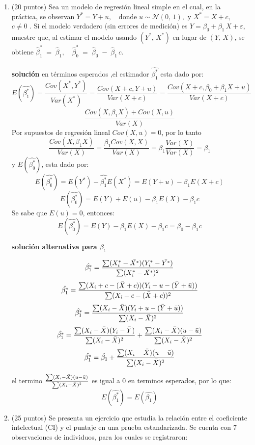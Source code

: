 \documentclass[10pt,a4paper]{article}
\begin{document}
\begin{enumerate}
\begin{enumerate}
\end{enumerate}

\item (20 puntos) Sea un modelo de regresión lineal simple en el cual, en la práctica, se observan $
Y^* = Y + u, \quad \text{donde } u \sim \mathcal{N}(0,\,1),
$ y $
X^* = X + c$, \quad {} $c \neq 0$ . Si el modelo verdadero (sin errores de medición) es $
Y = \beta_0 + \beta_1 \, X + \varepsilon$, muestre que, al estimar el modelo usando \((Y^*,\,X^*)\) en lugar de \((Y,\,X)\), se obtiene $\hat{\beta}_1^* \;=\; \hat{\beta}_1,
\quad
\hat{\beta}_0^* \;=\; \hat{\beta}_0 \;-\;\hat{\beta}_1 \, c.
$
\\
\\
\textbf{solución}
en términos esperados ,el estimador $\hat{\beta^*_1}$ esta dado por:
$$E(\hat{\beta^*_1})  =  \frac{Cov(X^*,Y^*)}{Var(X^*)} = \frac{Cov(X+c,Y+u)}{Var(X+c)}=\frac{Cov(X+c,\beta_0 + \beta_1X+u)}{Var(X+c)}$$
$$\frac{Cov(X,\beta_1X)+Cov(X,u)}{Var(X)}$$
Por supuestos de regresión lineal $Cov(X,u)=0$, por lo tanto
$$\frac{Cov(X,\beta_1X)}{Var(X)}=\frac{\beta_1Cov(X,X)}{Var(X)}=\beta_1\frac{Var(X)}{Var(X)}=\beta_1$$
y $E(\hat{\beta^*_0})$, esta dado por:
$$E(\hat{\beta^*_0})=E(Y^*)-\hat{\beta^*_1}E(X^*)=E(Y+u)-\beta_1E(X+c)$$
$$E(\hat{\beta^*_0}) = E(Y)+E(u)-\beta_1E(X)-\beta_1c$$
Se sabe que $E(u)=0$, entonces:
$$E(\hat{\beta^*_0}) = E(Y)-\beta_1E(X)-\beta_1c=\beta_0-\beta_1c$$

\textbf{solución alternativa para $\beta_1$}

$$\hat{\beta_1^*} = \frac{\sum (X_i^*-\Bar{X^*})(Y_i^*-\Bar{Y^*})}{\sum (X_i^*-\Bar{X^*})^2}$$
$$\hat{\beta_1^*} = \frac{\sum (X_i+c-(\Bar{X}+c))(Y_i+u-(\Bar{Y}+\Bar{u}))}{\sum (X_i+c-(\Bar{X}+c))^2}$$
$$\hat{\beta_1^*} = \frac{\sum (X_i-\Bar{X})(Y_i+u-(\Bar{Y}+\Bar{u}))}{\sum (X_i-\Bar{X})^2}$$
$$\hat{\beta_1^*} = \frac{\sum (X_i-\Bar{X})(Y_i-\Bar{Y})}{\sum (X_i-\Bar{X})^2} + \frac{\sum (X_i-\Bar{X})(u-\Bar{u})}{\sum (X_i-\Bar{X})^2}$$
$$\hat{\beta_1^*} = \hat{\beta_1} + \frac{\sum (X_i-\Bar{X})(u-\Bar{u})}{\sum (X_i-\Bar{X})^2}$$

el termino $\frac{\sum (X_i-\Bar{X})(u-\Bar{u})}{\sum (X_i-\Bar{X})^2}$ es igual a 0 en terminos esperados, por lo que:
 $$E(\hat{\beta_1^*}) = E(\hat{\beta_1})$$


\item (25 puntos) Se presenta un ejercicio que estudia la relación entre el coeficiente intelectual (CI) y el puntaje en una prueba estandarizada. Se cuenta con 7 observaciones de individuos, para los cuales se registraron:


\end{enumerate}
\end{document}
